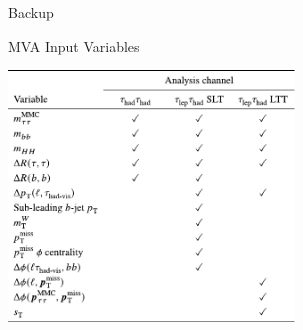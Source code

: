 \documentclass[11pt, xcolor={dvipsnames}, aspectratio=169]{beamer}
\begin{document}

\begin{frame}[standout]
  Backup
\end{frame}


\begin{frame}{MVA Input Variables}
  \centering

  \includegraphics[width=0.57\textwidth]{mva_input_table}
\end{frame}

\end{document}
